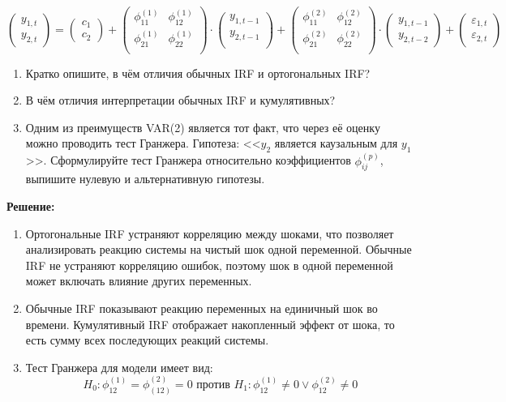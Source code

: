 \documentclass{article}
\begin{document}
\begin{enumerate}
$$
    \begin{pmatrix}
        y_{1, t} \\
        y_{2, t}
    \end{pmatrix}
    =
    \begin{pmatrix}
        c_1 \\
        c_2
    \end{pmatrix}
    +
    \begin{pmatrix}
        \phi_{11}^{(1)} & \phi_{12}^{(1)} \\
        \phi_{21}^{(1)} & \phi_{22}^{(1)} \\
    \end{pmatrix}
    \cdot
    \begin{pmatrix}
        y_{1, t-1} \\
        y_{2, t-1} \\
    \end{pmatrix}
    +
    \begin{pmatrix}
        \phi_{11}^{(2)} & \phi_{12}^{(2)} \\
        \phi_{21}^{(2)} & \phi_{22}^{(2)} \\
    \end{pmatrix}
    \cdot
    \begin{pmatrix}
        y_{1, t-1} \\
        y_{2, t-2}
    \end{pmatrix}
    +
    \begin{pmatrix}
        \varepsilon_{1, t} \\
        \varepsilon_{2, t}
    \end{pmatrix}
$$
\begin{enumerate}
    \item Кратко опишите, в чём отличия обычных IRF и ортогональных IRF?
    \item В чём отличия интерпретации обычных IRF и кумулятивных?
    \item Одним из преимуществ VAR(2) является тот факт, что через её оценку можно проводить тест Гранжера.
    Гипотеза: <<$y_2$ является каузальным для $y_1$>>. Сформулируйте тест Гранжера относительно коэффициентов
    $\phi_{ij}^{(p)}$, выпишите нулевую и альтернативную гипотезы.
\end{enumerate}

\textbf{Решение:}

\begin{enumerate}
    \item  Ортогональные IRF устраняют корреляцию между шоками, что позволяет анализировать реакцию системы на чистый шок одной переменной.
    Обычные IRF не устраняют корреляцию ошибок, поэтому шок в одной переменной может включать влияние других переменных.
    \item  Обычные IRF показывают реакцию переменных на единичный шок во времени. Кумулятивный IRF отображает накопленный эффект от шока, то есть сумму
    всех последующих реакций системы.
    \item Тест Гранжера для модели имеет вид:
    $$H_0: \phi_{12}^{(1)} = \phi_{(12)}^{(2)} = 0 \text{ против } H_1: \phi_{12}^{(1)}\not=0\lor\phi_{12}^{(2)}\not=0$$
\end{enumerate}


\end{enumerate}
\end{document}
